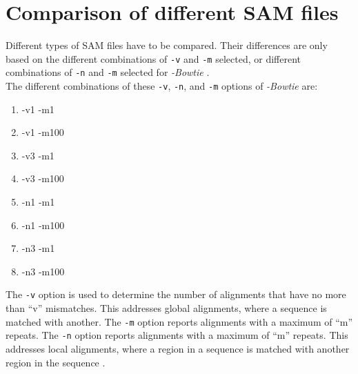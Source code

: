\documentclass[letter,12pt]{article}
\begin{document}
\section{Comparison of different SAM files}
\label{sec:ComparisonofDifferentSAMfiles}

Different types of SAM files have to be compared. Their differences are only based on the different combinations of {\tt -v} and {\tt -m} selected, or different combinations of {\tt -n} and {\tt -m} selected for {\it -Bowtie} \cite{Langmead2014}. \\

The different combinations of these {\tt -v}, {\tt -n}, and {\tt -m} options of {\it -Bowtie} are: \vspace{-0.3cm}
\begin{enumerate} \itemsep -4pt
\item -v1 -m1
\item -v1 -m100
\item -v3 -m1
\item -v3 -m100
\item -n1 -m1
\item -n1 -m100
\item -n3 -m1
\item -n3 -m100
\end{enumerate}

The {\tt -v} option is used to determine the number of alignments that have no more than ``v'' mismatches. This addresses global alignments, where a sequence is matched with another. The {\tt -m} option reports alignments with a maximum of ``m'' repeats. The {\tt -n} option reports alignments with a maximum of ``m'' repeats. This addresses local alignments, where a region in a sequence is matched with another region in the sequence \cite{Aramayo2014}.

\end{document}

